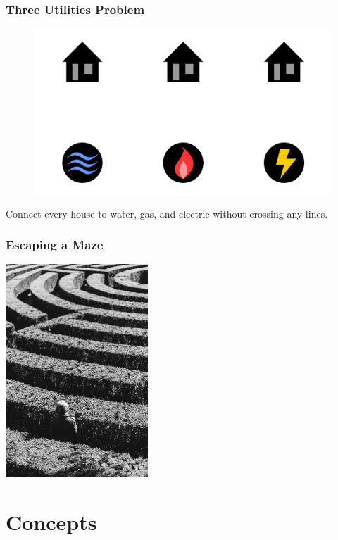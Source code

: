 \documentclass{beamer}
\theoremstyle{Plain}\newtheorem{kt}{Kuratowski's Theorem}
\theoremstyle{Definition}\newtheorem{te}{Tr\'emaux Exploration}
\theoremstyle{Definition}\newtheorem{dfs}{Depth-First Search}
\begin{document}
\begin{frame}
  \frametitle{Three Utilities Problem}
  \begin{figure}[h]
  \includegraphics[height=.5\textheight]{images/3utilities.png}
  \end{figure}
  Connect every house to water, gas, and electric without crossing any lines.
\end{frame}

\begin{frame}
  \frametitle{Escaping a Maze}
  \begin{center}
  \includegraphics[width=0.4\textwidth]{images/hedge.jpg}
  \end{center}
\end{frame}



\section{Concepts}
\end{document}
